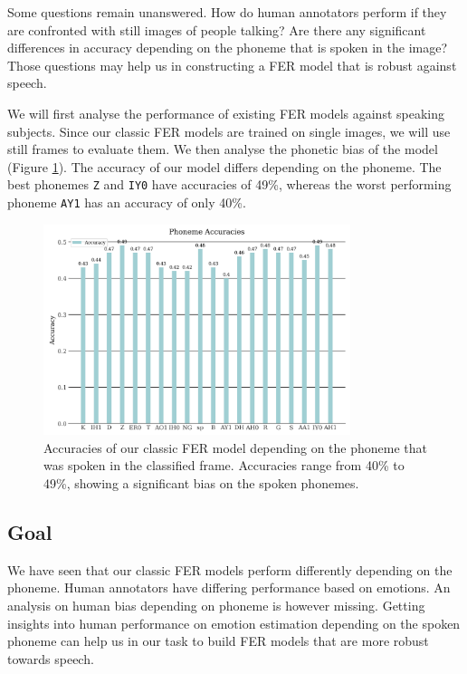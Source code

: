 Some questions remain unanswered. How do human annotators perform if they are confronted with still images of people talking? Are there any significant differences in accuracy depending on the phoneme that is spoken in the image? Those questions may help us in constructing a FER model that is robust against speech. 

We will first analyse the performance of existing FER models against speaking subjects. Since our classic FER models are trained on single images, we will use still frames to evaluate them. We then analyse the phonetic bias of the model (Figure \ref{fig:phone_acc_ravdess}). The accuracy of our model differs depending on the phoneme. The best phonemes \texttt{Z} and \texttt{IY0} have accuracies of 49\%, whereas the worst performing phoneme \texttt{AY1} has an accuracy of only 40\%.
\begin{figure}
    \centering
    \includegraphics[width=0.8\textwidth]{res/phone_acc_model.png}
    \caption{Accuracies of our classic FER model depending on the phoneme that was spoken in the classified frame. Accuracies range from 40\% to 49\%, showing a significant bias on the spoken phonemes.}
    \label{fig:phone_acc_ravdess}
\end{figure}
\subsection{Goal}
We have seen that our classic FER models perform differently depending on the phoneme. Human annotators have differing performance based on emotions. An analysis on human bias depending on phoneme is however missing. Getting insights into human performance on emotion estimation depending on the spoken phoneme can help us in our task to build FER models that are more robust towards speech.

